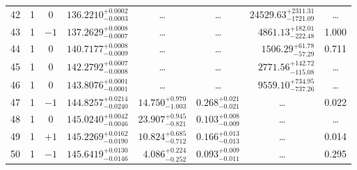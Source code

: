 \begin{table*}[!]
\begin{tabular}{llcrrlrc}
42 & 1 & 0 & $    136.2210_{-      0.0003}^{+      0.0002}$ & \multicolumn{1}{c}{\dots} & \multicolumn{1}{c}{\dots} & $    24529.63_{-     1721.09}^{+     2311.31}$ & \dots \\[1pt]
43 & 1 & $-1$ & $    137.2629_{-      0.0007}^{+      0.0008}$ & \multicolumn{1}{c}{\dots} & \multicolumn{1}{c}{\dots} & $     4861.13_{-      222.48}^{+      182.01}$ & 1.000 \\[1pt]
44 & 1 & 0 & $    140.7177_{-      0.0009}^{+      0.0008}$ & \multicolumn{1}{c}{\dots} & \multicolumn{1}{c}{\dots} & $     1506.29_{-       57.29}^{+       61.78}$ & 0.711\\[1pt]

45 & 1 & 0 & $    142.2792_{-      0.0008}^{+      0.0007}$ & \multicolumn{1}{c}{\dots} & \multicolumn{1}{c}{\dots} & $     2771.56_{-      115.08}^{+      142.72}$ & \dots \\[1pt]
46 & 1 & 0 & $    143.8076_{-      0.0001}^{+      0.0001}$ & \multicolumn{1}{c}{\dots} & \multicolumn{1}{c}{\dots} & $     9559.10_{-      737.26}^{+      734.95}$ & \dots \\[1pt]
47 & 1 & $-1$ & $    144.8257_{-      0.0240}^{+      0.0214}$ & $      14.750_{-       1.003}^{+       0.970}$ & $       0.268_{-       0.021}^{+       0.021}$ & \multicolumn{1}{c}{\dots} & 0.022\\[1pt]
48 & 1 & 0 & $    145.0240_{-      0.0046}^{+      0.0042}$ & $      23.907_{-       0.821}^{+       0.945}$ & $       0.103_{-       0.009}^{+       0.008}$ & \multicolumn{1}{c}{\dots} & \dots \\[1pt]
49 & 1 & $+1$ & $    145.2269_{-      0.0190}^{+      0.0162}$ & $      10.824_{-       0.712}^{+       0.685}$ & $       0.166_{-       0.013}^{+       0.013}$ & \multicolumn{1}{c}{\dots} & 0.014\\[1pt]
50 & 1 & $-1$ & $    145.6419_{-      0.0146}^{+      0.0130}$ & $       4.086_{-       0.252}^{+       0.224}$ & $       0.093_{-       0.011}^{+       0.009}$ & \multicolumn{1}{c}{\dots} & 0.295\\[1pt]
\hline
\end{tabular}
\end{table*}

